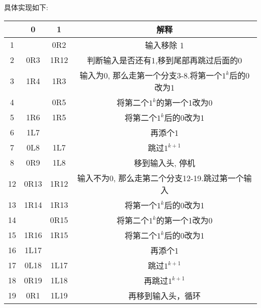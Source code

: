 \documentclass{article}
\begin{document}
具体实现如下:
\begin{center}
\begin{tabular}{|c|c|c|c|}
	\hline
	&0&1&解释\\
	\hline
	1&&0R2&输入移除     1\\
	2&0R3&1R12&判断输入是否还有1,移到尾部再跳过后面的0\\
	3&1R4&1R3&输入为0, 那么走第一个分支3-8.将第一个$1^k$后的0改为1\\
	4&&0R5&将第二个$1^k$的第一个1改为0\\
	5&1R6&1R5&将第二个$1^k$后的0改为1\\
	6&1L7&&再添个1\\
	7&0L8&1L7&跳过$1^{k+1}$\\
	8&0R9&1L8&移到输入头, 停机\\
	12&0R13&1R12&输入不为0, 那么走第二个分支12-19.跳过第一个输入\\
	13&1R14&1R13&将第一个$1^k$后的0改为1\\
	14&&0R15&将第二个$1^k$的第一个1改为0\\
	15&1R16&1R15&将第二个$1^k$后的0改为1\\
	16&1L17&&再添个1\\
	17&0L18&1L17&跳过$1^{k+1}$\\
	18&0R19&1L18&再跳过$1^{k+1}$\\
	19&0R1&1L19&再移到输入头，循环\\
	\hline
\end{tabular}
\end{center}
\end{document}
